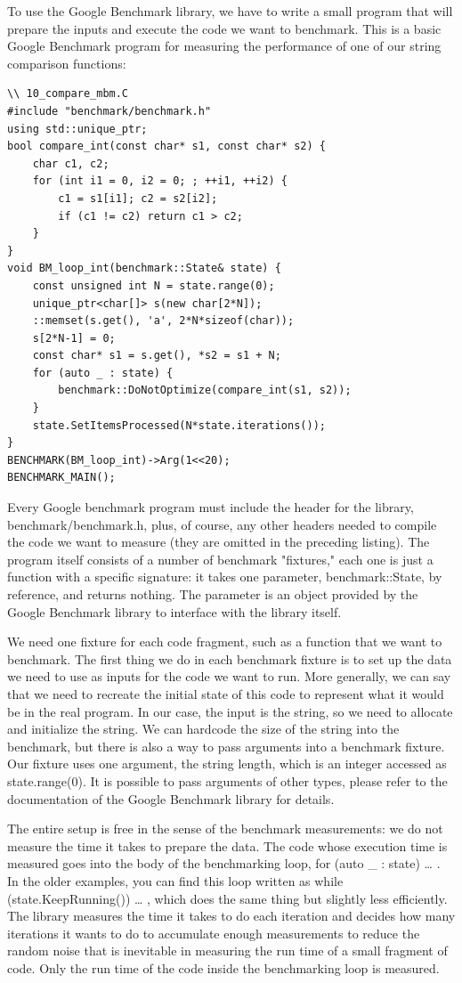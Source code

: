 To use the Google Benchmark library, we have to write a small program that will prepare the inputs and execute the code we want to benchmark. This is a basic Google Benchmark program for measuring the performance of one of our string comparison functions:


\begin{lstlisting}[style=styleCXX]
\\ 10_compare_mbm.C
#include "benchmark/benchmark.h"
using std::unique_ptr;
bool compare_int(const char* s1, const char* s2) {
	char c1, c2;
	for (int i1 = 0, i2 = 0; ; ++i1, ++i2) {
		c1 = s1[i1]; c2 = s2[i2];
		if (c1 != c2) return c1 > c2;
	}
}
void BM_loop_int(benchmark::State& state) {
	const unsigned int N = state.range(0);
	unique_ptr<char[]> s(new char[2*N]);
	::memset(s.get(), 'a', 2*N*sizeof(char));
	s[2*N-1] = 0;
	const char* s1 = s.get(), *s2 = s1 + N;
	for (auto _ : state) {
		benchmark::DoNotOptimize(compare_int(s1, s2));
	}
	state.SetItemsProcessed(N*state.iterations());
}
BENCHMARK(BM_loop_int)->Arg(1<<20);
BENCHMARK_MAIN();
\end{lstlisting}

Every Google benchmark program must include the header for the library, benchmark/benchmark.h, plus, of course, any other headers needed to compile the code we want to measure (they are omitted in the preceding listing). The program itself consists of a number of benchmark "fixtures," each one is just a function with a specific signature: it takes one parameter, benchmark::State, by reference, and returns nothing. The parameter is an object provided by the Google Benchmark library to interface with the library itself. 

We need one fixture for each code fragment, such as a function that we want to benchmark. The first thing we do in each benchmark fixture is to set up the data we need to use as inputs for the code we want to run. More generally, we can say that we need to recreate the initial state of this code to represent what it would be in the real program. In our case, the input is the string, so we need to allocate and initialize the string. We can hardcode the size of the string into the benchmark, but there is also a way to pass arguments into a benchmark fixture. Our fixture uses one argument, the string length, which is an integer accessed as state.range(0). It is possible to pass arguments of other types, please refer to the documentation of the Google Benchmark library for details.

The entire setup is free in the sense of the benchmark measurements: we do not measure the time it takes to prepare the data. The code whose execution time is measured goes into the body of the benchmarking loop, for (auto \_ : state) { … }. In the older examples, you can find this loop written as while (state.KeepRunning()) { … }, which does the same thing but slightly less efficiently. The library measures the time it takes to do each iteration and decides how many iterations it wants to do to accumulate enough measurements to reduce the random noise that is inevitable in measuring the run time of a small fragment of code. Only the run time of the code inside the benchmarking loop is measured.

